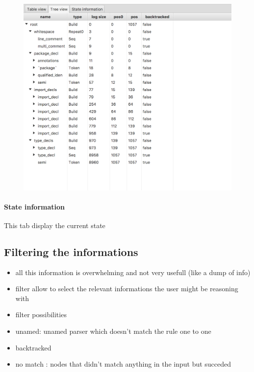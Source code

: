 		\begin{figure}[h]
			\centering
			\includegraphics[width=.7\textwidth] {ressources/treeview}
			\caption{} 
			\label{fig:treeview}
		\end{figure}

		\paragraph{State information} This tab display the current state


		\subsection{Filtering the informations}

		\begin{itemize}
			\item all this information is overwhelming and not very usefull (like a dump of info)
			\item filter allow to select the relevant informations the user might be reasoning with
			\item filter possibilities
			\item unamed: unamed parser which doesn't match the rule one to one 
			\item backtracked
			\item no match : nodes that didn't match anything in the input but succeded
		\end{itemize}


